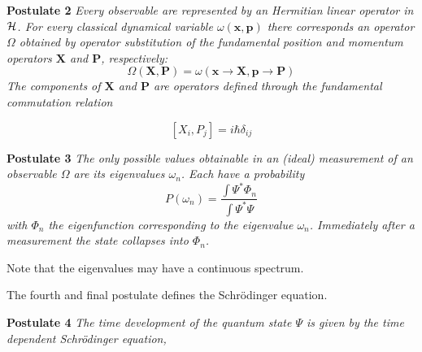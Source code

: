 {\bf \large Postulate 2}
\emph{
Every observable are represented by an Hermitian linear operator in
${\cal H}$. For every classical dynamical variable
$\omega(\mathbf{x},\mathbf{p})$ there corresponds an operator $\Omega$ 
obtained by operator substitution of the fundamental position and
momentum operators $\mathbf{X}$ and $\mathbf{P}$, respectively:
}
%
\begin{equation*}
  \Omega(\mathbf{X},\mathbf{P}) = \omega(\mathbf{x} \to
  \mathbf{X},\mathbf{p} \to \mathbf{P})
\end{equation*}
%
\emph{
The components of $\mathbf{X}$ and $\mathbf{P}$ are operators defined
through the fundamental commutation relation
}

\begin{equation*}
  \left[ X_i, P_j \right] = i \hbar \delta_{ij}
\end{equation*}


{\bf \large Postulate 3}
\emph{
The only possible values obtainable in an (ideal) measurement of an
observable $\Omega$ are its eigenvalues $\omega_n$. Each have a
probability
}
%
\begin{equation*}
  P(\omega_n) = \frac{\int \Psi^* \Phi_n }{\int \Psi^* \Psi }
\end{equation*}
%
\emph{
with $\Phi_n$ the eigenfunction corresponding to the eigenvalue
$\omega_n$. Immediately after a measurement the state collapses into
$\Phi_n$.
}
\newline

Note that the eigenvalues may have a continuous spectrum.
\newline



The fourth and final postulate defines the Schr\"odinger equation.
\newline

{\bf \large Postulate 4}
\emph{
The time development of the quantum state $\Psi$ is given by the time
dependent Schr\"odinger equation,
}


